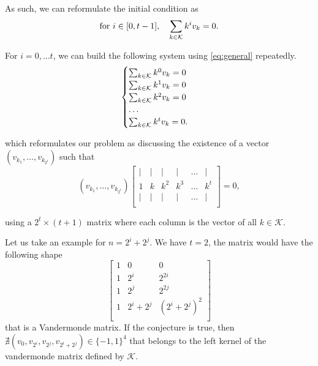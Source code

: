 As such, we can reformulate the initial condition as
\begin{equation}\label{eq:general}
    \text{for } i \in [0, t-1], \quad \sum_{k \in \mathcal{K}} k^iv_k = 0.
\end{equation}

For $i = 0, \ldots t$, we can build the following system using \cref{eq:general} repeatedly.
\begin{equation}
    \begin{cases}
        \sum_{k \in \mathcal{K}} k^0v_k = 0\\
        \sum_{k \in \mathcal{K}} k^1v_k = 0\\
        \sum_{k \in \mathcal{K}} k^2v_k = 0\\
        \ldots\\
        \sum_{k \in \mathcal{K}} k^tv_k = 0.\\
    \end{cases}
\end{equation}

which reformulates our problem as discussing the existence of a vector $(v_{k_1}, \ldots, v_{k_{2^t}})$ such that
$$
(v_{k_1}, \ldots, v_{k_{2^t}})
\begin{bmatrix}
    | & | & | & | & \ldots & |\\
    1 & k & k^2 & k^3 & \ldots & k^t\\
    | & | & | & | & \ldots & |\\
\end{bmatrix} = 0,
$$

using a  $2^t \times (t + 1)$ matrix where each column is the vector of all $k \in \mathcal{K}$.

Let us take an example for $n = 2^i + 2^j$. We have $t = 2$, the matrix would have the following shape
$$
\begin{bmatrix}
    1 & 0 & 0\\
    1 & 2^i & 2^{2i}\\
    1 & 2^j & 2^{2j}\\
    1 & 2^i + 2^j & (2^i + 2^j)^2\\
\end{bmatrix}
$$
that is a Vandermonde matrix. If the conjecture is true, then $\nexists (v_0, v_{2^i}, v_{2^j}, v_{2^i + 2^j}) \in \{-1, 1\}^4$ that belongs to the left kernel of the vandermonde matrix defined by $\mathcal{K}$.
